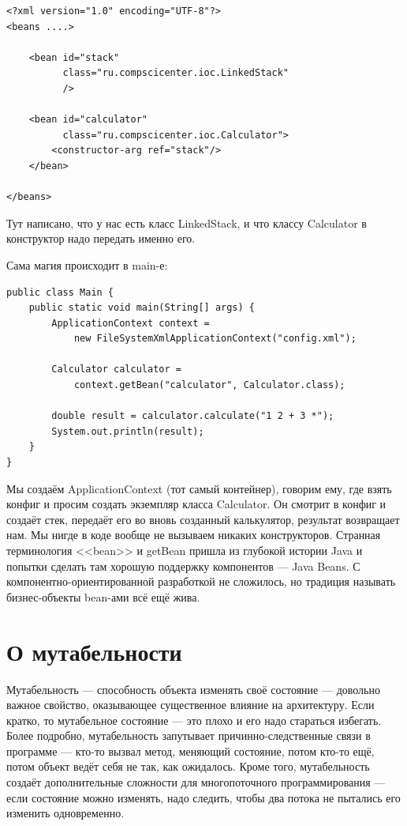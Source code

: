 \documentclass{../../text-style}
\begin{document}
\begin{verbatim}
<?xml version="1.0" encoding="UTF-8"?>
<beans ....>

    <bean id="stack"
          class="ru.compscicenter.ioc.LinkedStack"
          />

    <bean id="calculator"
          class="ru.compscicenter.ioc.Calculator">
        <constructor-arg ref="stack"/>
    </bean>

</beans>
\end{verbatim}

Тут написано, что у нас есть класс LinkedStack, и что классу Calculator в конструктор надо передать именно его.

Сама магия происходит в main-е:

\begin{verbatim}
public class Main {
    public static void main(String[] args) {
        ApplicationContext context = 
            new FileSystemXmlApplicationContext("config.xml");

        Calculator calculator = 
            context.getBean("calculator", Calculator.class);

        double result = calculator.calculate("1 2 + 3 *");
        System.out.println(result);
    }
}
\end{verbatim}

Мы создаём ApplicationContext (тот самый контейнер), говорим ему, где взять конфиг и просим создать экземпляр класса Calculator. Он смотрит в конфиг и создаёт стек, передаёт его во вновь созданный калькулятор, результат возвращает нам. Мы нигде в  коде вообще не вызываем никаких конструкторов. Странная терминология <<bean>> и getBean пришла из глубокой истории Java и попытки сделать там хорошую поддержку компонентов --- Java Beans. С компонентно-ориентированной разработкой не сложилось, но традиция называть бизнес-объекты bean-ами всё ещё жива.

\section{О мутабельности}

Мутабельность --- способность объекта изменять своё состояние --- довольно важное свойство, оказывающее существенное влияние на архитектуру. Если кратко, то мутабельное состояние --- это плохо и его надо стараться избегать. Более подробно, мутабельность запутывает причинно-следственные связи в программе --- кто-то вызвал метод, меняющий состояние, потом кто-то ещё, потом объект ведёт себя не так, как ожидалось. Кроме того, мутабельность создаёт дополнительные сложности для многопоточного программирования --- если состояние можно изменять, надо следить, чтобы два потока не пытались его изменить одновременно.
\end{document}

